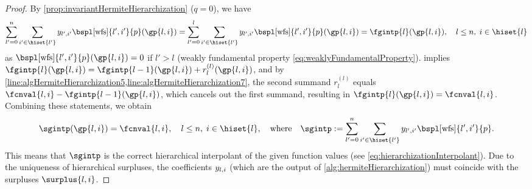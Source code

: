 \corAlgHermiteHierarchizationCorrectness*

\begin{proof}
  By \cref{prop:invariantHermiteHierarchization} ($q = 0$), we have
  \begin{equation}
  \sum_{l'=0}^n \sum_{i' \in \hiset{l'}}
  \linout{l',i'} \bspl[\wfs]{l',i'}{p}(\gp{l,i})
  = \sum_{l'=0}^l \sum_{i' \in \hiset{l'}}
  \linout{l',i'} \bspl[\wfs]{l',i'}{p}(\gp{l,i})
  = \fgintp{l}(\gp{l,i}),\quad
  l \le n,\; i \in \hiset{l}
  \end{equation}
  as $\bspl[\wfs]{l',i'}{p}(\gp{l,i}) = 0$ if $l' > l$
  (weakly fundamental property \eqref{eq:weaklyFundamentalProperty}).
   implies
  $\fgintp{l}(\gp{l,i})
  = \fgintp{l-1}(\gp{l,i}) + r^{(l)}_l(\gp{l,i})$,
  and by \cref{line:algHermiteHierarchization5,line:algHermiteHierarchization7},
  the second summand $r^{(l)}_l$ equals $\fcnval{l,i} - \fgintp{l-1}(\gp{l,i})$,
  which cancels out the first summand, resulting in
  $\fgintp{l}(\gp{l,i}) = \fcnval{l,i}$.
  Combining these statements, we obtain
  \begin{equation}
  \sgintp(\gp{l,i})
  = \fcnval{l,i},\quad
  l \le n,\; i \in \hiset{l},
  \quad\text{where}\quad
  \sgintp
  := \sum_{l'=0}^n \sum_{i' \in \hiset{l'}}
  \linout{l',i'} \bspl[\wfs]{l',i'}{p}.
  \end{equation}
  This means that $\sgintp$ is the correct hierarchical interpolant
  of the given function values
  (see \cref{eq:hierarchizationInterpolant}).
  Due to the uniqueness of hierarchical surpluses,
  the coefficients $\linout{l,i}$
  (which are the output of \cref{alg:hermiteHierarchization})
  must coincide with the surpluses $\surplus{l,i}$.
\end{proof}
